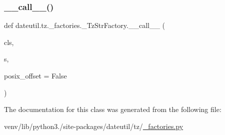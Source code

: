\subsubsection{\texorpdfstring{\+\_\+\+\_\+call\+\_\+\+\_\+()}{\_\_call\_\_()}}
{\footnotesize\ttfamily def dateutil.\+tz.\+\_\+factories.\+\_\+\+Tz\+Str\+Factory.\+\_\+\+\_\+call\+\_\+\+\_\+ (\begin{DoxyParamCaption}\item[{}]{cls,  }\item[{}]{s,  }\item[{}]{posix\+\_\+offset = {\ttfamily False} }\end{DoxyParamCaption})}



The documentation for this class was generated from the following file\+:\begin{DoxyCompactItemize}
\item 
venv/lib/python3./site-\/packages/dateutil/tz/\hyperlink{__factories_8py}{\+\_\+factories.\+py}\end{DoxyCompactItemize}

